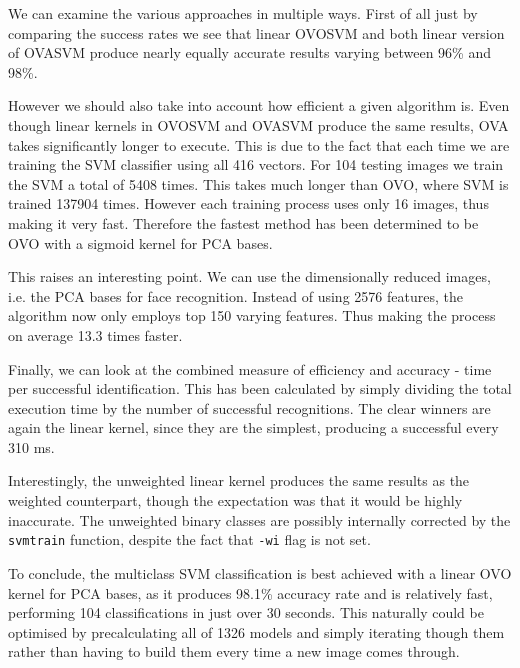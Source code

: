 \documentclass[10pt,twocolumn,letterpaper]{article}
\begin{document}
We can examine the various approaches in multiple ways. First of all just by comparing the success rates we see that linear OVOSVM and both linear version of OVASVM produce nearly equally accurate results varying between 96\% and 98\%.

However we should also take into account how efficient a given algorithm is. Even though linear kernels in OVOSVM and OVASVM produce the same results, OVA takes significantly longer to execute. This is due to the fact that each time we are training the SVM classifier using all 416 vectors. For 104 testing images we train the SVM a total of 5408 times. This takes much longer than OVO, where SVM is trained 137904 times. However each training process uses only 16 images, thus making it very fast. Therefore the fastest method has been determined to be OVO with a sigmoid kernel for PCA bases.

This raises an interesting point. We can use the dimensionally reduced images, i.e. the PCA bases for face recognition. Instead of using 2576 features, the algorithm now only employs top 150 varying features. Thus making the process on average 13.3 times faster.

Finally, we can look at the combined measure of efficiency and accuracy - time per successful identification. This has been calculated by simply dividing the total execution time by the number of successful recognitions. The clear winners are again the linear kernel, since they are the simplest, producing a successful  every 310 ms. 

Interestingly, the unweighted linear kernel produces the same results as the weighted counterpart, though the expectation was that it would be highly inaccurate. The unweighted binary classes are possibly internally corrected by the {\tt\small svmtrain} function, despite the fact that {\tt\small -wi} flag is not set.

To conclude, the multiclass SVM classification is best achieved with a linear OVO kernel for PCA bases, as it produces 98.1\% accuracy rate and is relatively fast, performing 104 classifications in just over 30 seconds. This naturally could be optimised by precalculating all of 1326 models and simply iterating though them rather than having to build them every time a new image comes through. 

{\small


}
\end{document}
